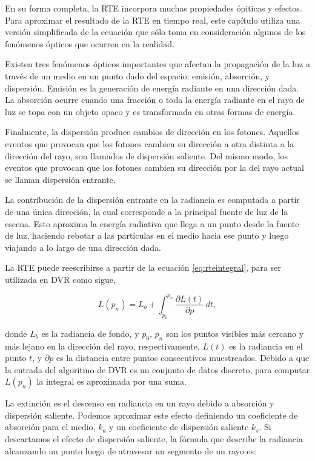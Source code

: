 En su forma completa, la RTE incorpora muchas propiedades ópiticas y efectos.
Para aproximar el resultado de la RTE en tiempo real, este capítulo utiliza una versión simplificada de la ecuación que sólo toma en consideración algunos de los fenómenos ópticos que ocurren en la realidad.

Existen tres fenómenos ópticos importantes que afectan la propagación de la luz a través de un medio en un punto dado del espacio: emisión, absorción, y dispersión.
Emisión es la generación de energía radiante en una dirección dada.
La absorción ocurre cuando una fracción o toda la energía radiante en el rayo de luz se topa con un objeto opaco y es transformada en otras formas de energía.

Finalmente, la dispersión produce cambios de dirección en los fotones.
Aquellos eventos que provocan que los fotones cambien su dirección a otra distinta a la dirección del rayo, son llamados de dispersión saliente. Del mismo modo, los eventos que provocan que los fotones cambien su dirección por la del rayo actual se llaman dispersión entrante.

%
La contribución de la dispersión entrante en la radiancia es computada a partir de una única dirección, la cual corresponde a la principal fuente de luz de la escena.
Esto aproxima la energía radiativa que llega a un punto desde la fuente de luz, haciendo rebotar a las partículas en el medio hacia ese punto y luego viajando a lo largo de una dirección dada. 

La RTE puede reescribirse a partir de la ecuación \ref{eq:rteintegral}, para ser utilizada en DVR como sigue,

\begin{equation} \label{eq:general_radiance}  
  L(p_n) = L_b + \int_{p_0}^{p_n} \frac{\partial L(t)}{\partial p} \, dt,
\end{equation}

\noindent donde $L_b$ es la radiancia de fondo, y $p_0$, $p_n$ son los puntos visibles más cercano y más lejano en la dirección del rayo, respectivamente, $L(t)$  es la radiancia en el punto $t$, y $\partial p$ es la distancia entre puntos consecutivos muestreados. 
Debido a que la entrada del algoritmo de DVR es un conjunto de datos discreto, para computar $L(p_n)$ la integral es aproximada por una suma.

La extinción es el descenso en radiancia en un rayo debido a absorción y dispersión saliente.
Podemos aproximar este efecto definiendo un coeficiente de absorción para el medio, $k_a$ y un coeficiente de dispersión saliente $k_s$. 
Si descartamos el efecto de dispersión saliente, la fórmula que describe la radiancia alcanzando un punto luego de atravesar un segmento de un rayo es:

